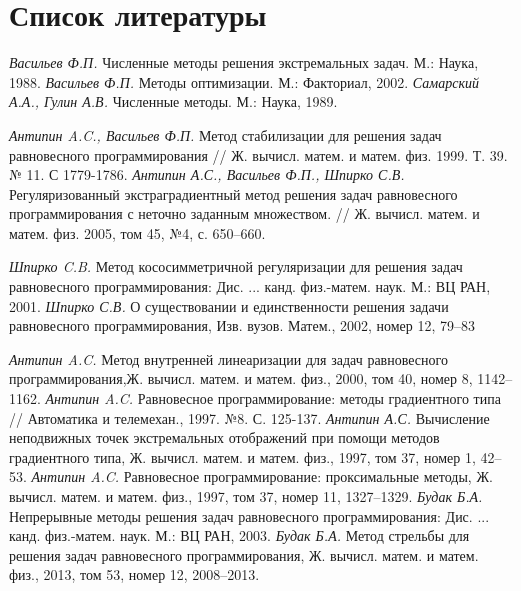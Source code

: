 {}
\section*{Список литературы}
	\begingroup
		\renewcommand{\section}[2]{}%
		\begin{thebibliography}{}
		 \emph{Васильев Ф.П.} Численные методы решения экстремальных задач. М.: Наука, 1988.
		 \emph{Васильев Ф.П.} Методы оптимизации. М.: Факториал, 2002.
		 \emph{Самарский А.А., Гулин А.В.} Численные методы. М.: Наука, 1989.
		
		 \textit{Антипин A.C., Васильев Ф.П.} Метод стабилизации для решения задач равновесного программирования // Ж. вычисл. матем. и матем. физ. 1999. Т. 39. № 11. С 1779-1786.
		  \emph{Антипин А.С., Васильев Ф.П., Шпирко С.В.} Регуляризованный экстраградиентный метод решения задач равновесного программирования с неточно заданным множеством. // Ж. вычисл. матем. и матем. физ. 2005, том 45, №4, с. 650–660.
		
		 \emph{Шпирко C.B.} Метод кососимметричной регуляризации для решения задач равновесного программирования: Дис. ... канд. физ.-матем. наук. М.: ВЦ РАН, 2001.
		 \emph{Шпирко С.В.} О существовании и единственности решения задачи равновесного программирования, Изв. вузов. Матем., 2002, номер 12, 79–83
		
		 \textit{Антипин A.C.} Метод внутренней линеаризации для задач равновесного программирования,Ж. вычисл. матем. и матем. физ., 2000, том 40, номер 8, 1142–1162.
		 \textit{Антипин A.C.} Равновесное программирование: методы градиентного типа // Автоматика и телемехан., 1997. №8. С. 125-137.
		 \textit{Антипин А.С.} Вычисление неподвижных точек экстремальных отображений при помощи методов градиентного типа, Ж. вычисл. матем. и матем. физ., 1997, том 37, номер 1, 42–53.
		 \textit{Антипин A.C.} Равновесное программирование: проксимальные методы, Ж. вычисл. матем. и матем. физ., 1997, том 37, номер 11, 1327–1329.
		 \emph{Будак Б.А.} Непрерывные методы решения задач равновесного программирования: Дис. ... канд. физ.-матем. наук. М.: ВЦ РАН, 2003.
		 \emph{Будак Б.А.} Метод стрельбы для решения задач равновесного программирования, Ж. вычисл. матем. и матем. физ., 2013, том 53, номер 12, 2008–2013.


\end{thebibliography}

